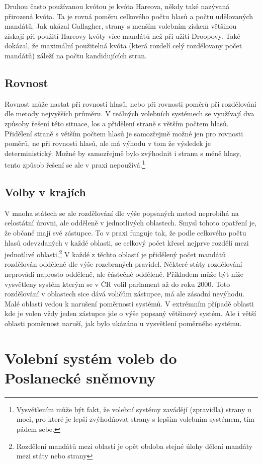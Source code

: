 \documentclass[12pt]{report}
\begin{document}
Druhou často používanou kvótou je kvóta Hareova, někdy také nazývaná přirozená kvóta.
Ta je rovná poměru celkového počtu hlasů a počtu udělovaných mandátů.
Jak ukázal Gallagher, strany s menším volebním ziskem většinou získají při použití Hareovy kvóty více mandátů než při užití Droopovy.
Také dokázal, že maximální použitelná kvóta (která rozdelí celý rozdělovany počet mandátů) záleží na počtu kandidujících stran.\autocite{GAL1} %
\section{Rovnost} Rovnost může nastat při rovnosti hlasů, nebo při rovnosti poměrů při rozdělování dle metody nejvyšších průměru.
V reálných volebních systémech se využívají dva způsoby řešení této situace, los a přidělení straně s větším počtem hlasů.
Přidělení straně s větším počtem hlasů je samozřejmě možné jen pro rovnosti poměrů, ne při rovnosti hlasů, ale má výhodu v tom že výsledek je deterministický.
Možné by samozřejmě bylo zvýhodnit i stranu s méně hlasy, tento způsob řešení se ale v praxi nepoužívá.\footnote{Vysvětlením může být fakt, že volební systémy zavádějí (zpravidla) strany u moci, pro které je lepší zvýhodňovat strany s lepším volebním systémem, tím pádem sebe.}
\section{Volby v krajích} V mnoha státech se ale rozdělování dle výše popsaných metod neprobíhá na celostátní úrovni, ale odděleně v jednotlivých oblastech.
Smysl tohoto opatření je, že občané mají své  zástupce.
To v praxi funguje tak, že podle celkového počtu hlasů odevzdaných v každé oblasti, se celkový počet křesel nejprve rozdělí mezi jednotlivé oblasti.\footnote{Rozdělení mandátů mezi oblastí je opět obdoba stejné úlohy dělení mandáty mezi státy nebo strany} V každé z těchto oblastí je přidělený počet mandátů rozdělován odděleně dle výše rozebraných pravidel.
Některé státy rozdělování neprovádí naprosto odděleně, ale částečně odděleně.
Příkladem může být níže vysvětleny systém kterým se v ČR volil parlament až do roku 2000.
Toto rozdělování v oblastech sice dává voličům  zástupce, má ale zásadní nevýhodu.
Malé oblasti vedou k narušení poměrnosti systémů.
V extrémním případě oblasti kde je volen vždy jeden zástupce jde o výše popsaný většinový systém.
Ale i větší oblasti poměrnost naruší, jak bylo ukázáno u vysvětlení poměrného systému.
\chapter{Volební systém voleb do Poslanecké sněmovny} 
\end{document}
